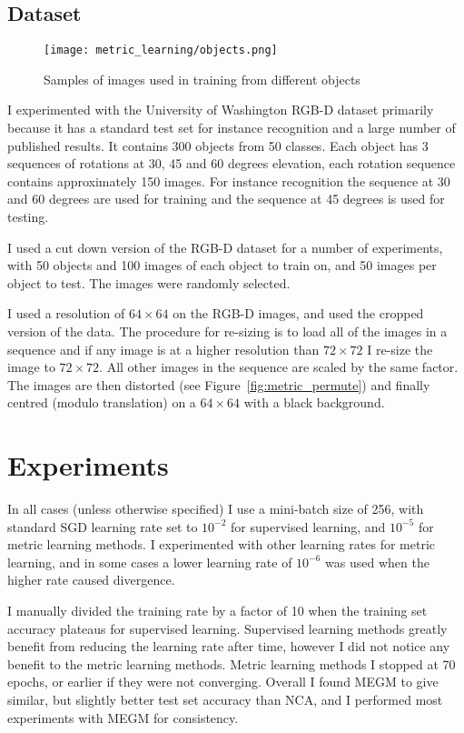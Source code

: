 \subsection {Dataset}

\begin{figure}[h]
\centering
\texttt{[image: metric\_learning/objects.png]}
\caption{Samples of images used in training from different objects}
\label{fig:metric_dataset}
\end{figure}

I experimented with the University of Washington RGB-D dataset primarily because it has a standard test set for instance recognition and a large number of published results. It contains 300 objects from 50 classes. Each object has 3 sequences of rotations at 30, 45 and 60 degrees elevation, each rotation sequence contains approximately 150 images. For instance recognition the sequence at 30 and 60 degrees are used for training and the sequence at 45 degrees is used for testing. 

I used a cut down version of the RGB-D dataset for a number of experiments, with 50 objects and 100 images of each object to train on, and 50 images per object to test. The images were randomly selected.

I used a resolution of $ 64\times64 $ on the RGB-D images, and used the cropped version of the data. The procedure for re-sizing is to load all of the images in a sequence and if any image is at a higher resolution than $ 72\times72 $ I re-size the image to $ 72\times72 $. All other images in the sequence are scaled by the same factor. The images are then distorted (see Figure~\ref{fig:metric_permute}) and finally centred (modulo translation) on a  $ 64\times64 $ with a black background.


\section {Experiments}


In all cases (unless otherwise specified) I use a mini-batch size of 256, with standard \gls{SGD} learning rate set to $ 10^{-2} $ for supervised learning, and $ 10^{-5} $ for metric learning methods. I experimented with other learning rates for metric learning, and in some cases a lower learning rate of $ 10^{-6} $ was used when the higher rate caused divergence.

I manually divided the training rate by a factor of 10 when the training set accuracy plateaus for supervised learning. Supervised learning methods greatly benefit from reducing the learning rate after time, however I did not notice any benefit to the metric learning methods. Metric learning methods I stopped at 70 epochs, or earlier if they were not converging. Overall I found \gls{MEGM} to give similar, but slightly better test set accuracy than \gls{NCA}, and I performed most experiments with \gls{MEGM} for consistency.




